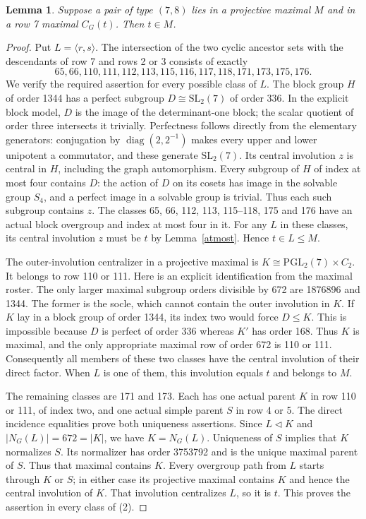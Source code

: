 \documentclass[11pt,a4paper]{article}
\newtheorem{lemma}{Lemma}\newtheorem{theorem}{Theorem}
\begin{document}
\begin{lemma}\label{inside}
Suppose a pair of type $(7,8)$ lies in a projective maximal $M$ and
in a row 7 maximal $C_G(t)$. Then $t\in M$.
\end{lemma}
\begin{proof}
Put $L=\langle r,s\rangle$. The intersection of the two cyclic
ancestor sets with the descendants of row 7 and rows 2 or 3 consists
of exactly
\[
65,66,110,111,112,113,115,116,117,118,171,173,175,176.             \tag{2}
\]
We verify the required assertion for every possible class of $L$.
The block group $H$ of order 1344 has a perfect subgroup
$D\cong\mathrm{SL}_2(7)$ of order 336. In the explicit block model,
$D$ is the image of the determinant-one block; the scalar quotient
of order three intersects it trivially. Perfectness follows directly from the elementary generators: conjugation
by $\operatorname{diag}(2,2^{-1})$ makes every upper and lower
unipotent a commutator, and these generate $\mathrm{SL}_2(7)$.
Its central involution $z$
is central in $H$, including the graph automorphism. Every subgroup
of $H$ of index at most four contains $D$: the action of $D$ on
its cosets has image in the solvable group $S_4$, and a perfect
image in a solvable group is trivial. Thus each such subgroup
contains $z$. The classes 65, 66, 112, 113, 115--118, 175 and 176
have an actual block overgroup and index at most four in it.
For any $L$ in these classes, its central involution $z$ must be
$t$ by Lemma~\ref{atmost}. Hence $t\in L\leq M$.

The outer-involution centralizer in a projective maximal is
$K\cong\mathrm{PGL}_2(7)\times C_2$. It belongs to row 110 or 111.
Here is an explicit identification from the maximal roster.
The only larger maximal subgroup orders divisible by 672 are
1876896 and 1344. The former is the socle, which cannot contain the
outer involution in $K$. If $K$ lay in a block group of order 1344,
its index two would force $D\leq K$. This is impossible because
$D$ is perfect of order 336 whereas $K'$ has order 168.
Thus $K$ is maximal, and the only appropriate maximal row of order
672 is 110 or 111. Consequently all members of these two classes
have the central involution of their direct factor. When $L$ is
one of them, this involution equals $t$ and belongs to $M$.

The remaining classes are 171 and 173. Each has one actual parent
$K$ in row 110 or 111, of index two, and one actual simple parent
$S$ in row 4 or 5. The direct incidence equalities prove both
uniqueness assertions. Since $L\lhd K$ and $|N_G(L)|=672=|K|$,
we have $K=N_G(L)$. Uniqueness of $S$ implies that $K$ normalizes
$S$. Its normalizer has order 3753792 and is the unique maximal
parent of $S$. Thus that maximal contains $K$.
Every overgroup path from $L$ starts through $K$ or $S$; in either
case its projective maximal contains $K$ and hence the central
involution of $K$. That involution centralizes $L$, so it is $t$.
This proves the assertion in every class of (2).
\end{proof}
\end{document}

